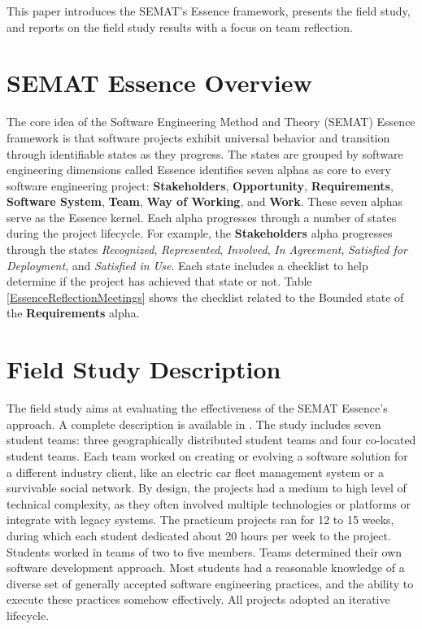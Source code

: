 This paper introduces the SEMAT's Essence framework, presents the field study, and reports on the field study results with a focus on team reflection.

\section{SEMAT Essence Overview}
The core idea of the Software Engineering Method and Theory (SEMAT) Essence framework \cite{SEMATKernel} is that software projects exhibit universal behavior and transition through identifiable states as they progress. The states are grouped by software engineering dimensions called  Essence identifies seven alphas as core to every software engineering project: \textbf{Stakeholders}, \textbf{Opportunity}, \textbf{Requirements}, \textbf{Software System}, \textbf{Team}, \textbf{Way of Working}, and \textbf{Work}. These seven alphas serve as the Essence kernel. Each alpha progresses through a number of states during the project lifecycle. For example, the \textbf{Stakeholders} alpha progresses through the states \textit{Recognized}, \textit{Represented}, \textit{Involved}, \textit{In Agreement}, \textit{Satisfied for Deployment}, and \textit{Satisfied in Use}. Each state includes a checklist to help determine if the project has achieved that state or not. Table \ref{EssenceReflectionMeetings} shows the checklist related to the Bounded state of the \textbf{Requirements} alpha.




\section{Field Study Description}
The field study aims at evaluating the effectiveness of the SEMAT Essence's approach. A complete description is available in \cite{ICSE2014}. The study includes seven student teams: three geographically distributed student teams and four co-located student teams. Each team worked on creating or evolving a software solution for a different industry client, like an electric car fleet management system or a survivable social network. By design, the projects had a medium to high level of technical complexity, as they often involved multiple technologies or platforms or integrate with legacy systems. The practicum projects ran for 12 to 15 weeks, during which each student dedicated about 20 hours per week to the project. Students worked in teams of two to five members. Teams determined their own software development approach. Most students had a reasonable knowledge of a diverse set of generally accepted software engineering practices, and the ability to execute these practices somehow effectively. All projects adopted an iterative lifecycle.
   
